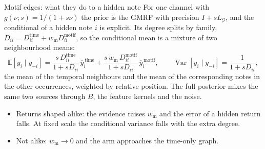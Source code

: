 \documentclass[aspectratio=169,11pt]{beamer}
\newcommand{\Lg}{L_{\mathcal G}}
\begin{document}
\begin{frame}{Motif edges: what they do to a hidden note}
  \small
  For one channel with $g(\nu; s) = 1/(1 + s\nu)$ the prior is the GMRF
  with precision $I + s\Lg$, and the conditional of a hidden note $i$ is
  explicit. Its degree splits by family,
  $D_{ii} = D_{ii}^{\text{time}} + w_{\text{m}} D_{ii}^{\text{motif}}$, so the
  conditional mean is a mixture of two neighbourhood means:
  \[
    \mathbb E[y_i \mid y_{-i}] =
    \frac{s\, D_{ii}^{\text{time}}}{1 + s D_{ii}}\,\overline{y}^{\,\text{time}}_i
    + \frac{s\, w_{\text{m}}\, D_{ii}^{\text{motif}}}{1 + s D_{ii}}\,\overline{y}^{\,\text{motif}}_i,
    \qquad
    \operatorname{Var}[y_i \mid y_{-i}] = \frac{1}{1 + s D_{ii}},
  \]
  the mean of the temporal neighbours and the mean of the corresponding
  notes in the other occurrences, weighted by relative position. The
  full posterior mixes the same two sources through $B$, the feature
  kernels and the noise.
  \begin{itemize}
    \item Returns shaped alike: the evidence raises $w_{\text{m}}$ and the
          error of a hidden return falls. At fixed scale the conditional
          variance falls with the extra degree.
    \item Not alike: $w_{\text{m}} \to 0$ and the arm approaches the
          time-only graph.
  \end{itemize}
\end{frame}
\end{document}
